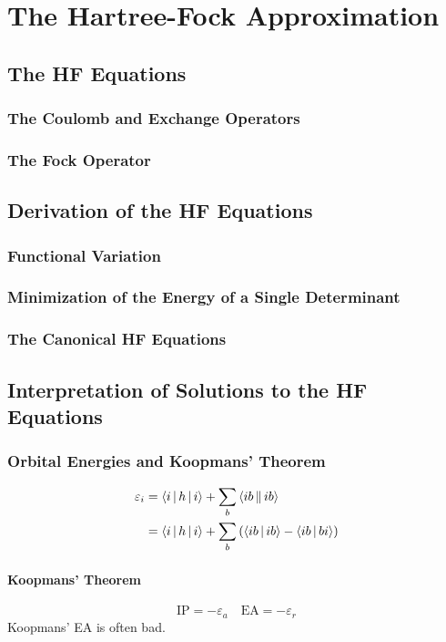 \documentclass[a4paper]{article}
\numberwithin{equation}{section}
\begin{document}
\section{The Hartree-Fock Approximation}
\subsection{The HF Equations}
\subsubsection{The Coulomb and Exchange Operators}
\subsubsection{The Fock Operator}
\subsection{Derivation of the HF Equations}
\subsubsection{Functional Variation}
\subsubsection{Minimization of the Energy of a Single Determinant}
\subsubsection{The Canonical HF Equations}

\subsection{Interpretation of Solutions to the HF Equations}
\subsubsection{Orbital Energies and Koopmans' Theorem}
\begin{align}\label{key}
\varepsilon_i &= \Braket{i|h|i} + \sum_b \Braket{ib||ib} \\
&= \Braket{i|h|i} + \sum_b \qty(\Braket{ib|ib} - \Braket{ib|bi})
\end{align}
\paragraph{Koopmans' Theorem}
\begin{equation}\label{key}
\text{IP} = -\varepsilon_a \quad 
\text{EA} = -\varepsilon_r
\end{equation}
Koopmans' EA is often bad.
\end{document}
